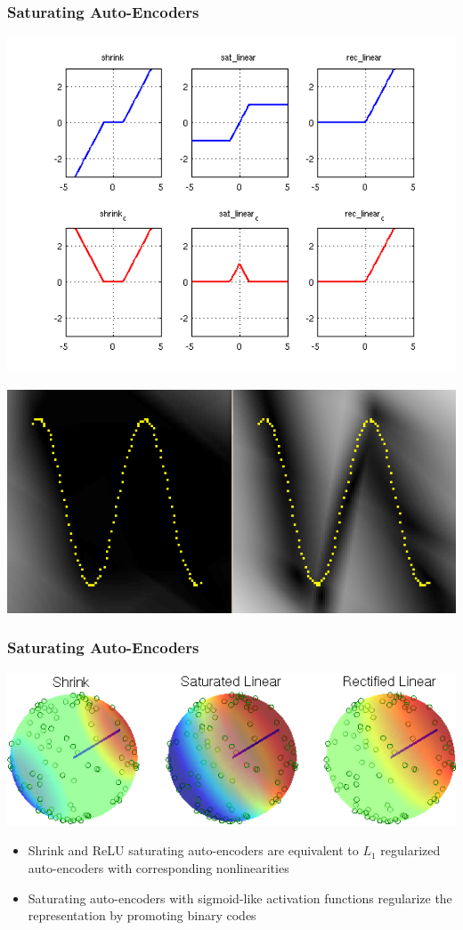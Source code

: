 \documentclass{beamer}
\begin{document}
\begin{frame}
\frametitle{Saturating Auto-Encoders} 
\centerline{\includegraphics[scale=0.35]{./images/SATAE/compliments.png}}
\centerline{\includegraphics[scale=0.3]{./images/SATAE/toy_shrink.png}}
\end{frame} 

\begin{frame}
\frametitle{Saturating Auto-Encoders} 
\centerline{\includegraphics[scale=0.35]{./images/SATAE/viz_nonlin.png}}
\begin{itemize} 
\item Shrink and ReLU saturating auto-encoders are equivalent to $L_1$ regularized auto-encoders with corresponding nonlinearities 
\item Saturating auto-encoders with sigmoid-like activation functions regularize the representation by promoting binary codes 
\end{itemize} 
\end{frame} 
\end{document}
